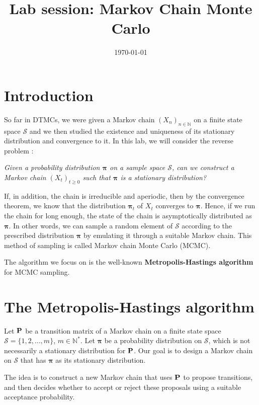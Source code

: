 \documentclass[12pt]{article}
\title{\bfseries \Huge Lab session: Markov Chain Monte Carlo}
\author{}
\date{\today}
\newcommand{\N}{\mathbb N}
\newcommand{\bP}{\bold P}
\newcommand{\calS}{\mathcal S}
\begin{document}
	\maketitle
	\section{Introduction}
	
	So far in DTMCs, we were given a Markov chain $(X_n)_{n\in \N}$ on a finite state space $\calS$ and we then studied the existence and uniqueness of its stationary distribution and convergence to it. 
	In this lab, we will consider the reverse problem :
	
	\textit{Given a probability distribution $\bm\pi$ on a sample space $\calS$, can we construct a Markov chain $(X_t)_{t \geq 0}$ such that $\bm\pi$ is a stationary distribution?}
	
	If, in addition, the chain is irreducible and aperiodic, then by the convergence theorem, we know that the distribution $\bm\pi_t$ of $X_t$ converges to $\bm\pi$. Hence, if we run the chain for long enough, the state of the chain is asymptotically distributed as $\bm\pi$. In other words, we can sample a random element of $\calS$ according to the prescribed distribution $\bm\pi$ by emulating it through a suitable Markov chain. This method of sampling is called Markov chain Monte Carlo (MCMC).
	
	The algorithm  we focus on is the well-known \textbf{Metropolis-Hastings algorithm} for MCMC sampling.
	
	\section{The Metropolis-Hastings algorithm}
	Let $\bP$ be a transition matrix of a Markov chain on a finite state space $\calS = \{1, 2, \dots, m\}$, $m\in\N^*$. 
	Let $\bm\pi$ be a probability distribution on $\calS$, which is not necessarily a stationary distribution for $\bP$. Our goal is to design a Markov chain on $\calS$ that has $\bm\pi$ as its stationary distribution.
	
	The idea is to construct a new Markov chain that uses $\bP$ to propose transitions, and then decides whether to accept or reject these proposals using a suitable acceptance probability.
	
\end{document}
